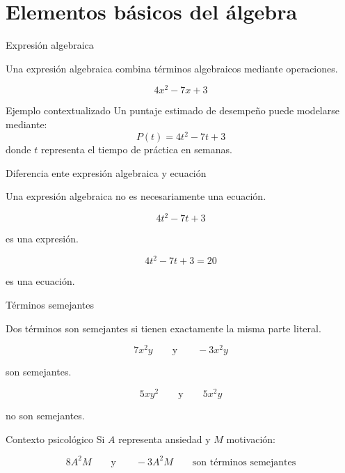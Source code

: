 \documentclass[aspectratio=169]{beamer}
\begin{document}
	\section{Elementos básicos del álgebra}
	\begin{frame}{Expresión algebraica}
		\begin{idea}
			Una expresión algebraica combina términos algebraicos mediante operaciones.
		\end{idea}
		\[
		4x^2-7x+3
		\]
		
		\pause
		
		\begin{exampleblock}{Ejemplo contextualizado}
			Un puntaje estimado de desempeño puede modelarse mediante:
					\[
			P(t)=4t^2-7t+3
			\]
			donde \(t\) representa el tiempo de práctica en semanas.
		\end{exampleblock}
	\end{frame}	
	
	\begin{frame}{Diferencia ente expresión algebraica y ecuación}
		
		\begin{alerta}
			Una expresión algebraica no es necesariamente una ecuación.
			
			\[
			4t^2-7t+3
			\]
			
			es una expresión.
			
			\[
			4t^2-7t+3=20
			\]
			
			es una ecuación.
		\end{alerta}
	\end{frame}
	
	
	\begin{frame}{Términos semejantes}
		\begin{idea}
			Dos términos son semejantes si tienen exactamente la misma parte literal.
		\end{idea}
		
		\[
		7x^2y
		\qquad\text{y}\qquad
		-3x^2y
		\]
		
		son semejantes.
		
		\pause
		
		\[
		5xy^2
		\qquad\text{y}\qquad
		5x^2y
		\]
		
		no son semejantes.
		
		\pause
		
		\begin{exampleblock}{Contexto psicológico}
			Si \(A\) representa ansiedad y \(M\) motivación:
			
			\[
			8A^2M
			\qquad\text{y}\qquad
			-3A^2M \qquad 
			 \text{son términos semejantes}
			 \]
		\end{exampleblock}
	\end{frame}
	
\end{document}
